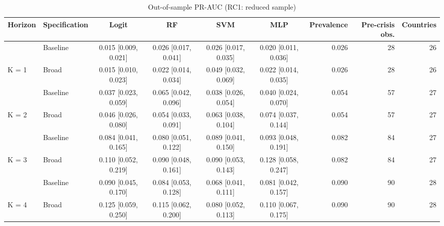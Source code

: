 \begin{table}

\caption{\label{tab:pr_boot_rc1}Out-of-sample PR-AUC (RC1: reduced sample)}
\centering
\begin{tabular}[t]{llccccrrr}
\toprule
Horizon & Specification & Logit & RF & SVM & MLP & Prevalence & Pre-crisis obs. & Countries\\
\midrule
 & Baseline & 0.015 [0.009, 0.021] & 0.026 [0.017, 0.041] & 0.026 [0.017, 0.035] & 0.020 [0.011, 0.036] & 0.026 & 28 & 26\\

\multirow[t]{-1}{*}[\normalbaselineskip]{\raggedright\arraybackslash K = 1} & Broad & 0.015 [0.010, 0.023] & 0.022 [0.014, 0.034] & 0.049 [0.032, 0.069] & 0.022 [0.014, 0.035] & 0.026 & 28 & 26\\
\cmidrule{1-9}
 & Baseline & 0.037 [0.023, 0.059] & 0.065 [0.042, 0.096] & 0.038 [0.026, 0.054] & 0.040 [0.024, 0.070] & 0.054 & 57 & 27\\

\multirow[t]{-1}{*}[\normalbaselineskip]{\raggedright\arraybackslash K = 2} & Broad & 0.046 [0.026, 0.080] & 0.054 [0.033, 0.091] & 0.063 [0.038, 0.104] & 0.074 [0.037, 0.144] & 0.054 & 57 & 27\\
\cmidrule{1-9}
 & Baseline & 0.084 [0.041, 0.165] & 0.080 [0.051, 0.122] & 0.089 [0.041, 0.150] & 0.093 [0.048, 0.191] & 0.082 & 84 & 27\\

\multirow[t]{-1}{*}[\normalbaselineskip]{\raggedright\arraybackslash K = 3} & Broad & 0.110 [0.052, 0.219] & 0.090 [0.048, 0.161] & 0.090 [0.053, 0.143] & 0.128 [0.058, 0.247] & 0.082 & 84 & 27\\
\cmidrule{1-9}
 & Baseline & 0.090 [0.045, 0.170] & 0.084 [0.053, 0.128] & 0.068 [0.041, 0.111] & 0.081 [0.042, 0.157] & 0.090 & 90 & 28\\

\multirow[t]{-1}{*}[\normalbaselineskip]{\raggedright\arraybackslash K = 4} & Broad & 0.125 [0.059, 0.250] & 0.115 [0.062, 0.200] & 0.080 [0.052, 0.113] & 0.110 [0.067, 0.175] & 0.090 & 90 & 28\\
\bottomrule
\end{tabular}
\end{table}
